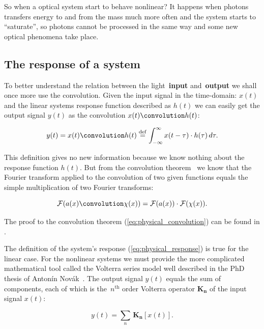 \documentclass[12pt,twoside,a4paper]{article}
\numberwithin{equation}{subsection}
\numberwithin{figure}{subsection}
\begin{document}
So when a optical system start to behave nonlinear? It happens when photons transfers energy to and from the mass much more often and the system starts to ``saturate'', so photons cannot be processed in the same way and some new optical phenomena take place.

\subsection{The response of a system} \label{chap:physical_systemresponse}

To better understand the relation between the light~\textbf{input} and~\textbf{output} we shall once more use the convolution. Given the input signal in the time-domain: $ x(t) $ and the linear systems response function described as $ h(t) $ we can easily get the output signal $ y(t) $ as the convolution $ x(t) \convolution h(t) $:

\begin{equation} \label{eq:physical_response}
  y(t) = x(t) \convolution h(t) \stackrel{\mathrm{def}}{=} \int_{ - \infty}^{ \infty} x( t - \tau ) \cdot h(\tau) \, d\tau .
\end{equation}

This definition gives no new information because we know nothing about the response function $ h(t) $. But from the convolution theorem~\cite{katznelson_introduction} we know that the Fourier transform applied to the convolution of two given functions equals the simple multiplication of two Fourier transforms:

\begin{equation} \label{eq:physical_convolution}
  \mathcal{F}(a(x) \convolution \chi(x)) = \mathcal{F}(a(x)) \cdot \mathcal{F}(\chi(x)) .
\end{equation}

The proof to the convolution theorem (\ref{eq:physical_convolution}) can be found in \cite{titchmarsh_introduction}.

The definition of the system's response (\ref{eq:physical_response}) is true for the linear case. For the nonlinear systems we must provide the more complicated mathematical tool called the Volterra series model well described in the PhD thesis of Antonín Novák~\cite{thesis_novak}. The output signal $ y(t) $ equals the sum of components, each of which is the~$ n ^ {\text{th}} $ order Volterra operator $ \mathbf{K_n} $ of the input signal $ x(t) $:

\begin{equation} \label{eq:physical_volterraseries}
  y(t) = \sum_{n} \, \mathbf{K_n}[x (t) ].
\end{equation}
\end{document}
